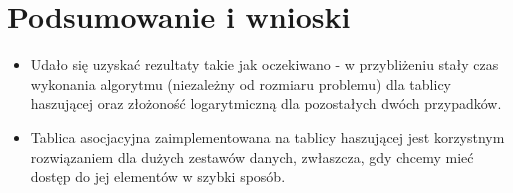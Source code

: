 \documentclass{mwart}
\begin{document}
\newpage
\section{Podsumowanie i wnioski}
\begin{itemize}
\item Udało się uzyskać rezultaty takie jak oczekiwano - w przybliżeniu stały czas wykonania algorytmu (niezależny od rozmiaru problemu) dla tablicy haszującej oraz złożoność logarytmiczną dla pozostałych dwóch przypadków.
\item Tablica asocjacyjna zaimplementowana na tablicy haszującej jest korzystnym rozwiązaniem dla dużych zestawów danych, zwłaszcza, gdy chcemy mieć dostęp do jej elementów w szybki sposób.
\end{itemize}
\end{document}
